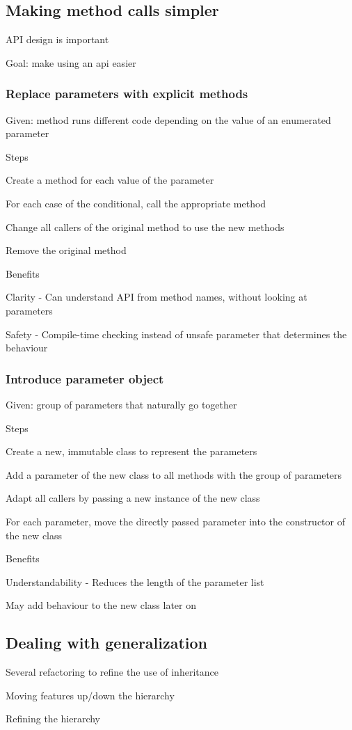 \subsection{Making method calls simpler}
\enumstart
	\item API design is important
	\item Goal: make using an api easier
\enumend

\subsubsection{Replace parameters with explicit methods}
\enumstart
	\item Given: method runs different code depending on the value of an enumerated parameter
	\item Steps
	\enumstart
		\item Create a method for each value of the parameter
		\item For each case of the conditional, call the appropriate method
		\item Change all callers of the original method to use the new methods
		\item Remove the original method
	\enumend
	\item Benefits
	\enumstart
		\item Clarity - Can understand API from method names, without looking at parameters
		\item Safety - Compile-time checking instead of unsafe parameter that determines the behaviour
	\enumend
\enumend

\subsubsection{Introduce parameter object}
\enumstart
	\item Given: group of parameters that naturally go together
	\item Steps
	\enumstart
		\item Create a new, immutable class to represent the parameters
		\item Add a parameter of the new class to all methods with the group of parameters
		\item Adapt all callers by passing a new instance of the new class
		\item For each parameter, move the directly passed parameter into the constructor of the new class
	\enumend
	\item Benefits
	\enumstart
		\item Understandability - Reduces the length of the parameter list
		\item May add behaviour to the new class later on
	\enumend
\enumend

\subsection{Dealing with generalization}
\enumstart
	\item Several refactoring to refine the use of inheritance
	\item Moving features up/down the hierarchy
	\item Refining the hierarchy
\enumend
